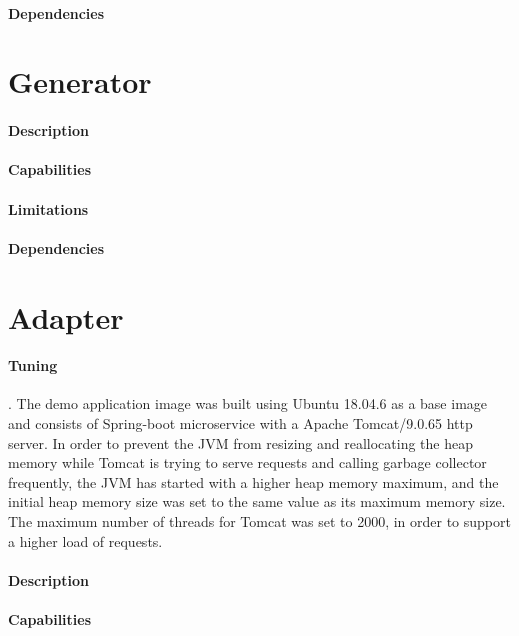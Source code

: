 \paragraph{Dependencies}

\section{Generator} %
\label{sec:generator}

\paragraph{Description}
\paragraph{Capabilities}
\paragraph{Limitations}
\paragraph{Dependencies}

\section{Adapter} %
\label{sec:adapter}

\paragraph{Tuning}. The demo application image was built using Ubuntu 18.04.6 as a base image and consists of Spring-boot microservice with a Apache Tomcat/9.0.65 http server.
In order to prevent the JVM from resizing and reallocating the heap memory while Tomcat is trying to serve requests and
calling garbage collector frequently, the JVM has started with a higher heap memory maximum, and the initial heap memory
size was set to the same value as its maximum memory size.
The maximum number of threads for Tomcat was set to 2000, in order to support a higher load of requests.

\paragraph{Description}
\paragraph{Capabilities}

